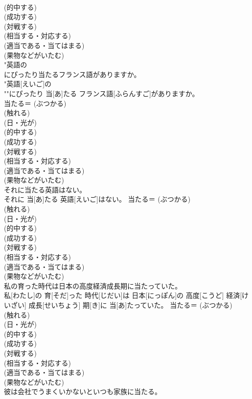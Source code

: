 \documentclass[8pt]{extreport}
\begin{document}
\begin{CJK}{UTF8}{min}
{\\	(的中する) 
\\	(成功する) 
\\	(対戦する) 
\\	(相当する・対応する) 
\\	(適当である・当てはまる) 
\\	(果物などがいたむ)
\\	"英語の 
\\	にぴったり当たるフランス語がありますか。
\\	"英語[えいご]の
\\	""にぴったり 当[あ]たる フランス語[ふらんすご]がありますか。
\\	当たる＝ (ぶつかる) 
\\	(触れる) 
\\	(日・光が) 
\\	(的中する) 
\\	(成功する) 
\\	(対戦する) 
\\	(相当する・対応する) 
\\	(適当である・当てはまる) 
\\	(果物などがいたむ)
\\	それに当たる英語はない。	
\\	それに 当[あ]たる 英語[えいご]はない。	当たる＝ (ぶつかる) 
\\	(触れる) 
\\	(日・光が) 
\\	(的中する) 
\\	(成功する) 
\\	(対戦する) 
\\	(相当する・対応する) 
\\	(適当である・当てはまる) 
\\	(果物などがいたむ)
\\	私の育った時代は日本の高度経済成長期に当たっていた。	
\\	私[わたし]の 育[そだ]った 時代[じだい]は 日本[にっぽん]の 高度[こうど] 経済[けいざい] 成長[せいちょう] 期[き]に 当[あ]たっていた。	当たる＝ (ぶつかる) 
\\	(触れる) 
\\	(日・光が) 
\\	(的中する) 
\\	(成功する) 
\\	(対戦する) 
\\	(相当する・対応する) 
\\	(適当である・当てはまる) 
\\	(果物などがいたむ)
\\	彼は会社でうまくいかないといつも家族に当たる。	
}
\end{CJK}
\end{document}
